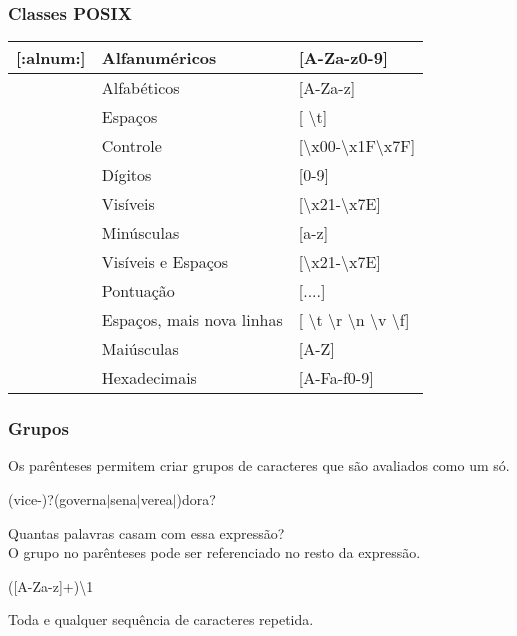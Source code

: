 \documentclass{beamer}
\begin{document}
   \begin{frame}
      \frametitle{Classes POSIX}
      \begin{table}
         \begin{tabular}{ c | l | l}
         [:alnum:] & Alfanuméricos & [A-Za-z0-9]   \\
         \hline 
         [:alpha:] & Alfabéticos & [A-Za-z] \\
         \hline
	 [:blank:] & Espaços  & [ \textbackslash t] \\
         \hline 
         [:cntrl:] & Controle & [\textbackslash x00-\textbackslash x1F\textbackslash x7F] \\
         \hline
	 [:digit:] & Dígitos &  [0-9] \\
         \hline 
         [:graph:] & Visíveis & [\textbackslash x21-\textbackslash x7E] \\
         \hline
	 [:lower:] & Minúsculas & [a-z] \\
         \hline 
         [:print:] & Visíveis e Espaços & [\textbackslash x21-\textbackslash x7E]  \\
         \hline
         [:punct:] & Pontuação & [....]  \\
         \hline 
         [:space:] & Espaços, mais nova linhas & [ \textbackslash t \textbackslash r \textbackslash n \textbackslash v \textbackslash f] \\
         \hline
	 [:upper:] & Maiúsculas & [A-Z] \\
         \hline 
         [:xdigit:] & Hexadecimais & [A-Fa-f0-9] \\
         \hline
         \end{tabular}
      \end{table}
   \end{frame}

   \begin{frame}
      \frametitle{Grupos}
      Os parênteses permitem criar grupos de caracteres que são avaliados como um só. \\ 	
      \begin{center}
         (vice-)?(governa$|$sena$|$verea$|$)dora?
      \end{center}
      Quantas palavras casam com essa expressão? \\
      O grupo no parênteses pode ser referenciado no resto da expressão.
      \begin{center}
         ([A-Za-z]+)\textbackslash 1
      \end{center}
      Toda e qualquer sequência de caracteres repetida.
   \end{frame}
\end{document}
